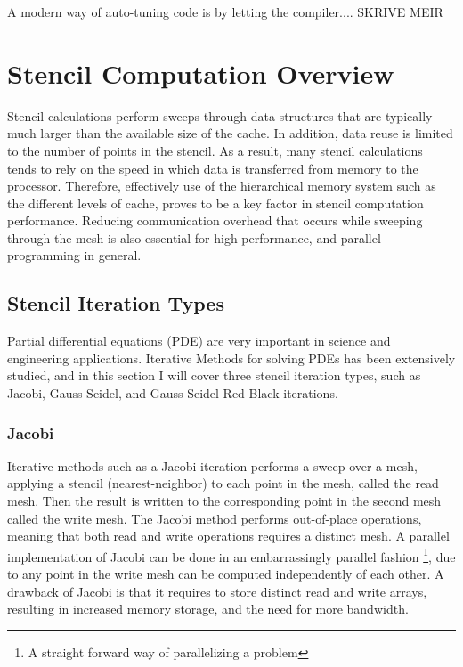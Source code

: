 A modern way of auto-tuning code is by letting the compiler.... SKRIVE MEIR

\section{Stencil Computation Overview}
Stencil calculations perform sweeps through data structures that are typically much larger than the available size of the cache. In addition, data reuse is limited to the number of points in the stencil. As a result, many stencil calculations tends to rely on the speed in which data is transferred from memory to the processor. Therefore, effectively use of the hierarchical memory system such as the different levels of cache, proves to be a key factor in stencil computation performance. Reducing communication overhead that occurs while sweeping through the mesh is also essential for high performance, and parallel programming in general.

\subsection{Stencil Iteration Types}
\label{subsec:stencil_iteration_types}
Partial differential equations (PDE) are very important in science and engineering applications. Iterative Methods for solving PDEs has been extensively studied, and in this section I will cover three stencil iteration types, such as Jacobi, Gauss-Seidel, and Gauss-Seidel Red-Black iterations.

\subsubsection{Jacobi}
Iterative methods such as a Jacobi iteration performs a sweep over a mesh, applying a stencil (nearest-neighbor) to each point in the mesh, called the read mesh. Then the result is written to the corresponding point in the second mesh called the write mesh. The Jacobi method performs out-of-place operations, meaning that both read and write operations requires a distinct mesh. A parallel implementation of Jacobi can be done in an embarrassingly parallel fashion \footnote{A straight forward way of parallelizing a problem}, due to any point in the write mesh can be computed independently of each other. A drawback of Jacobi is that it requires to store distinct read and write arrays, resulting in increased memory storage, and the need for more bandwidth.

